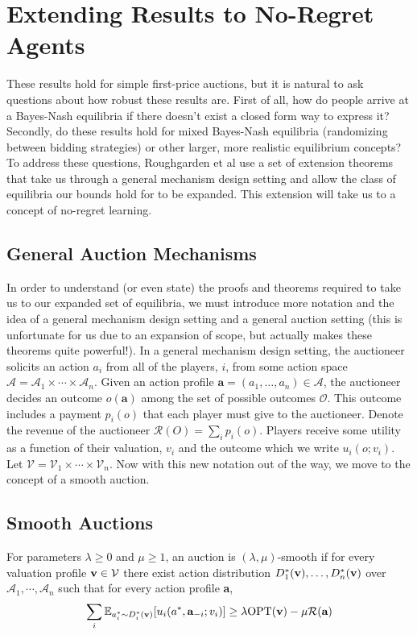 \documentclass[12pt,twoside]{reedthesis}
\begin{document}
\section{Extending Results to No-Regret Agents}
These results hold for simple first-price auctions, but it is natural to ask questions about how robust these results are. First of all, how do people arrive at a Bayes-Nash equilibria if there doesn't exist a closed form way to express it? Secondly, do these results hold for mixed Bayes-Nash equilibria (randomizing between bidding strategies) or other larger, more realistic equilibrium concepts? To address these questions, Roughgarden et al use a set of extension theorems that take us through a general mechanism design setting and allow the class of equilibria our bounds hold for to be expanded. This extension will take us to a concept of no-regret learning.

\subsection{General Auction Mechanisms}

In order to understand (or even state) the proofs and theorems required to take us to our expanded set of equilibria, we must introduce  more notation and the idea of a general mechanism design setting and a general auction setting (this is unfortunate for us due to an expansion of scope, but actually makes these theorems quite powerful!). In a general mechanism design setting, the auctioneer solicits an action $a_i$ from all of the players, $i$, from some action space $\mathcal{A} = \mathcal{A}_1 \times \cdots \times \mathcal{A}_n$. Given an action profile $\textbf{a} = (a_1, \dots, a_n) \in \mathcal{A}$, the auctioneer decides an outcome $o(\textbf{a})$ among the set of possible outcomes $\mathcal{O}$. This outcome includes a payment $p_i(o)$ that each player must give to the auctioneer. Denote the revenue of the auctioneer $\mathcal{R}(O) = \sum_i p_i(o)$. Players receive some utility as a function of their valuation, $v_i$ and the outcome which we write $u_i(o;v_i)$. Let $\mathcal{V} = \mathcal{V}_1 \times \cdots \times \mathcal{V}_n$. Now with this new notation out of the way, we move to the concept of a smooth auction.

\subsection{Smooth Auctions}

\begin{dfn}
	For parameters $\lambda \geq 0$ and $\mu \geq 1$, an auction is $(\lambda, \mu)$-smooth if for every valuation profile $\textbf{v} \in \mathcal{V}$ there exist action distribution $D_1^{*}(\textbf{v}), \ldots , D_n^*(\textbf{v})$ over $\mathcal{A}_1, \cdots, \mathcal{A}_n$ such that for every action profile \textbf{a},
	$$ \sum_i \mathbb{E}_{a_i^* \sim D_i^*(\textbf{v})}[u_i(a^*, \textbf{a}_{-i};v_i)] \geq \lambda \text{OPT}(\textbf{v}) - \mu \mathcal{R}(\textbf{a})$$
\end{dfn}
\end{document}
